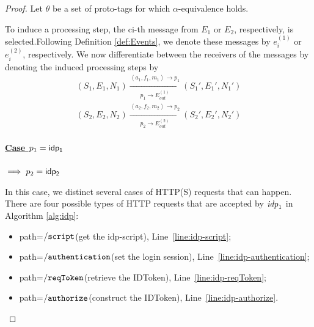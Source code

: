   \begin{proof}
    Let $\theta$ be a set of proto-tags for which 
    $\alpha$-equivalence holds.
    
    To induce a processing step, the ci-th message from $E_1$ or 
    $E_2$, respectively, is selected.Following Definition 
    \ref{def:Events}, we denote these messages by $e_i^{(1)}$ or 
    $e_i^{(2)}$, respectively. We now differentiate between the 
    receivers of the messages by denoting the induced processing 
    steps by
    \begin{equation}
      \begin{aligned}
        (S_1,E_1,N_1)\xrightarrow[p_1\rightarrow E_{out}^{(1)}]{\left \langle a_1,f_1,m_1\right \rangle\rightarrow p_1}(S_1\prime,E_1\prime,N_1\prime)\\
        (S_2,E_2,N_2)\xrightarrow[p_2\rightarrow E_{out}^{(2)}]{\left \langle a_2,f_2,m_2\right \rangle\rightarrow p_2}(S_2\prime,E_2\prime,N_2\prime)
      \end{aligned}
    \end{equation}
    \paragraph{\underline{Case $p_1 = \mathsf{idp_1}$}}
    $\implies p_2 = \mathsf{idp_2}$

    In this case, we distinct several cases of HTTP(S) requests that can happen.
    There are four possible types of HTTP requests that are accepted by $\mathit{idp}_1$ in Algorithm \ref{alg:idp}:
    
    \begin{itemize}
      \item path=$\mathtt{/script}$(get the idp-script), Line~\ref{line:idp-script};
      \item path=$\mathtt{/authentication}$(set the login session), Line~\ref{line:idp-authentication};
      \item path=$\mathtt{/reqToken}$(retrieve the IDToken), Line~\ref{line:idp-reqToken};
      \item path=$\mathtt{/authorize}$(construct the IDToken), Line~\ref{line:idp-authorize}.
    \end{itemize}


\end{proof}
